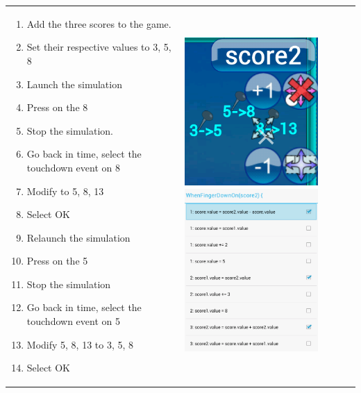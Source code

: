 \documentclass[12pt]{article} %
\begin{document}
\begin{tabular}{l l}
\begin{minipage}{0.5\textwidth}
\begin{enumerate}
  \item Add the three scores to the game.
  \item Set their respective values to 3, 5, 8
  \item Launch the simulation
  \item Press on the 8
  \item Stop the simulation.
  \item Go back in time, select the touchdown event on 8
  \item Modify to 5, 8, 13
  \item Select OK
  \item Relaunch the simulation
  \item Press on the 5
  \item Stop the simulation
  \item Go back in time, select the touchdown event on 5
  \item Modify 5, 8, 13 to 3, 5, 8
  \item Select OK
\end{enumerate}
\end{minipage}
&
\begin{minipage}{0.5\textwidth}
\includegraphics[width=2in]{captures/fibonacci1}
\includegraphics[width=2in]{captures/fibonacci2}
\end{minipage}
\end{tabular}
\end{document}
